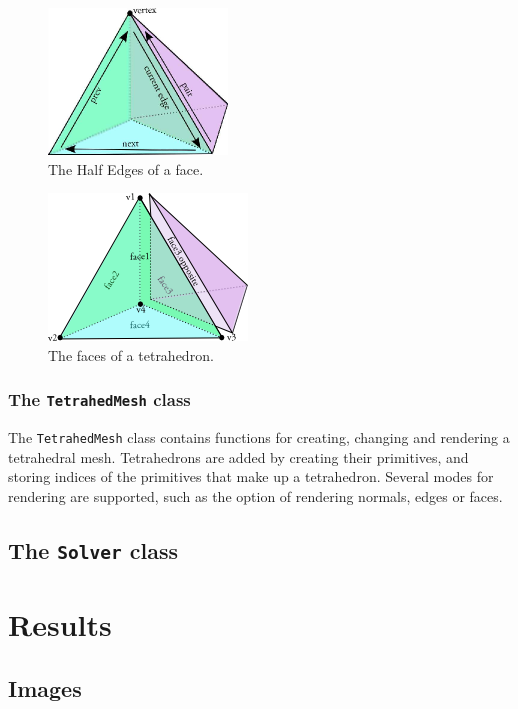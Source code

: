 \documentclass[10pt,a4paper]{article}
\begin{document}
\begin{figure}[htbp]
\label{fig:tetraedge}
\begin{center}
\includegraphics[scale=1]{figures/tetra_edge}
\caption{The Half Edges of a face.}
\end{center}
\end{figure}

\begin{figure}[htbp]
\label{fig:tetraface}
\begin{center}
\includegraphics[scale=1]{figures/tetra_face}
\caption{The faces of a tetrahedron.}
\end{center}
\end{figure}


\subsubsection{The \texttt{TetrahedMesh} class}
The \texttt{TetrahedMesh} class contains functions for creating, changing and rendering a tetrahedral mesh. Tetrahedrons are added by creating their primitives, and storing indices of the primitives that make up a tetrahedron. Several modes for rendering are supported, such as the option of rendering normals, edges or faces. 

\subsection{The \texttt{Solver} class}



\section{Results}
\subsection{Images}
\end{document}
